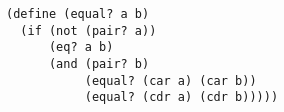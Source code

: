 \documentclass[a4paper,12pt]{article}
\begin{document}
\begin{lstlisting}
(define (equal? a b)
  (if (not (pair? a))
      (eq? a b)
      (and (pair? b)
           (equal? (car a) (car b))
           (equal? (cdr a) (cdr b)))))
\end{lstlisting}
\end{document}
